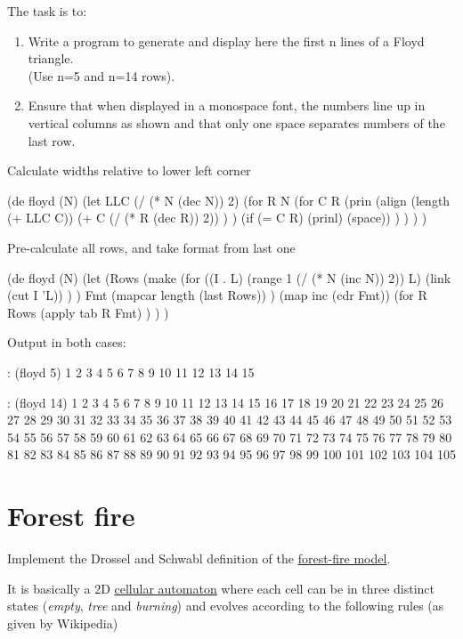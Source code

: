 The task is to:

\begin{enumerate}
\item
  Write a program to generate and display here the first n lines of a
  Floyd triangle.\\(Use n=5 and n=14 rows).
\item
  Ensure that when displayed in a monospace font, the numbers line up in
  vertical columns as shown and that only one space separates numbers of
  the last row.
\end{enumerate}


\begin{wideverbatim}

Calculate widths relative to lower left corner

(de floyd (N)
   (let LLC (/ (* N (dec N)) 2)
      (for R N
         (for C R
            (prin
               (align
                  (length (+ LLC C))
                  (+ C (/ (* R (dec R)) 2)) ) )
            (if (= C R) (prinl) (space)) ) ) ) )

Pre-calculate all rows, and take format from last one

(de floyd (N)
   (let
      (Rows
         (make
            (for ((I . L) (range 1 (/ (* N (inc N)) 2))  L)
               (link (cut I 'L)) ) )
         Fmt (mapcar length (last Rows)) )
      (map inc (cdr Fmt))
      (for R Rows
         (apply tab R Fmt) ) ) )

Output in both cases:

: (floyd 5)
 1
 2  3
 4  5  6
 7  8  9 10
11 12 13 14 15

: (floyd 14)
 1
 2  3
 4  5  6
 7  8  9 10
11 12 13 14 15
16 17 18 19 20 21
22 23 24 25 26 27 28
29 30 31 32 33 34 35 36
37 38 39 40 41 42 43 44  45
46 47 48 49 50 51 52 53  54  55
56 57 58 59 60 61 62 63  64  65  66
67 68 69 70 71 72 73 74  75  76  77  78
79 80 81 82 83 84 85 86  87  88  89  90  91
92 93 94 95 96 97 98 99 100 101 102 103 104 105

\end{wideverbatim}

\pagebreak{}
\section*{Forest fire}

Implement the Drossel and Schwabl definition of the
\href{http://en.wikipedia.org/wiki/Forest-fire\_model}{forest-fire
model}.

It is basically a 2D
\href{http://en.wikipedia.org/wiki/Cellular\_automaton}{cellular
  automaton} where each cell can be in three distinct states
(\emph{empty}, \emph{tree} and \emph{burning}) and evolves according
to the following rules (as given by Wikipedia)

